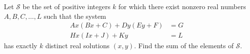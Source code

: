 Let $\mathcal S$ be the set of positive integers $k$ for which there exist nonzero real numbers $A,B,C,\dots,L$ such that the system
\[\begin{aligned}Ax(Bx+C)+Dy(Ey+F)&=G\\Hx(Ix+J)+Ky&=L\end{aligned}\]
has exactly $k$ distinct real solutions $(x,y)$. Find the sum of the elements of $\mathcal S$.
